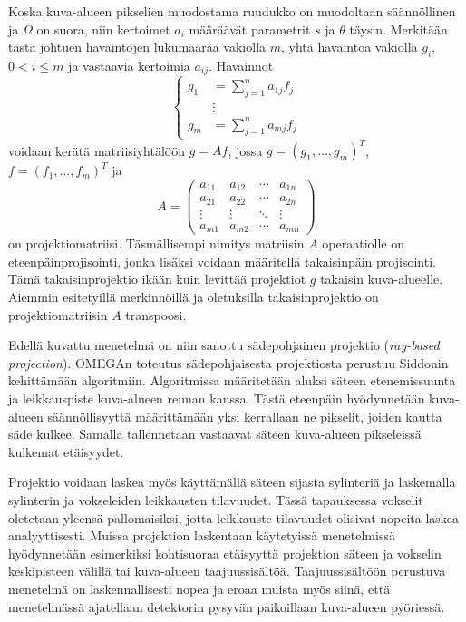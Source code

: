 Koska kuva-alueen pikselien muodostama ruudukko on muodoltaan säännöllinen ja $\Omega$ on suora, niin kertoimet $a_i$ määräävät parametrit $s$ ja $\theta$ täysin. Merkitään tästä johtuen havaintojen lukumäärää vakiolla $m$, yhtä havaintoa vakiolla $g_i$, $0<i\leq m$ ja vastaavia kertoimia $a_{ij}$. Havainnot
\begin{equation*}
    \begin{cases}
        g_1&=\sum_{j=1}^{n}a_{1j}f_{j}\\
        &\vdots\\
        g_m&=\sum_{j=1}^{n}a_{mj}f_{j}
    \end{cases}
\end{equation*}
voidaan kerätä matriisiyhtälöön $g=Af$, jossa $g=\left( g_1, \ldots, g_m \right)^{T}$, $f=\left( f_1, \ldots, f_m \right)^{T}$ ja
\begin{equation*}
    A=
    \begin{pmatrix}
        a_{11} & a_{12} & \cdots & a_{1n} \\
        a_{21} & a_{22} & \cdots & a_{2n} \\
        \vdots & \vdots & \ddots & \vdots \\
        a_{m1} & a_{m2} & \cdots & a_{mn}
    \end{pmatrix}
\end{equation*}
on projektiomatriisi. Täsmällisempi nimitys matriisin $A$ operaatiolle on eteenpäinprojisointi, jonka lisäksi voidaan määritellä takaisinpäin projisointi. Tämä takaisinprojektio ikään kuin levittää projektiot $g$ takaisin kuva-alueelle. Aiemmin esitetyillä merkinnöillä ja oletuksilla takaisinprojektio on projektiomatriisin $A$ transpoosi.

Edellä kuvattu menetelmä on niin sanottu sädepohjainen projektio (\textit{ray-based projection}). OMEGAn toteutus sädepohjaisesta projektiosta perustuu Siddonin kehittämään algoritmiin\cite{wettenhovi_omegaopen-source_2021}. Algoritmissa määritetään aluksi säteen etenemissuunta ja leikkauspiste kuva-alueen reunan kanssa. Tästä eteenpäin hyödynnetään kuva-alueen säännöllisyyttä määrittämään yksi kerrallaan ne pikselit, joiden kautta säde kulkee. Samalla tallennetaan vastaavat säteen kuva-alueen pikseleissä kulkemat etäisyydet.\cite{siddon_fast_1985, sundermann_fast_1998}

Projektio voidaan laskea myös käyttämällä säteen sijasta sylinteriä ja laskemalla sylinterin ja vokseleiden leikkausten tilavuudet. Tässä tapauksessa vokselit oletetaan yleensä pallomaisiksi, jotta leikkauste tilavuudet olisivat nopeita laskea analyyttisesti.\cite{lougovski_volume_2014} Muissa projektion laskentaan käytetyissä menetelmissä hyödynnetään esimerkiksi kohtisuoraa etäisyyttä projektion säteen ja vokselin keskipisteen välillä\cite{aguiar_geometrical_2010} tai kuva-alueen taajuussisältöä\cite{zeng_frequency_1992, zeng_rotating_1994}. Taajuussisältöön perustuva menetelmä on laskennallisesti nopea ja eroaa muista myös siinä, että menetelmässä ajatellaan detektorin pysyvän paikoillaan kuva-alueen pyöriessä\cite{zeng_frequency_1992, zeng_rotating_1994}.

